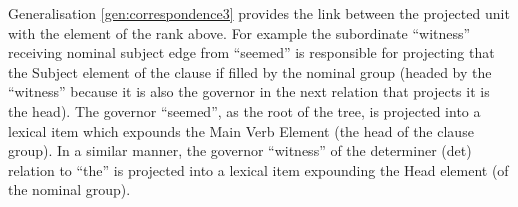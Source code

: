 Generalisation \ref{gen:correspondence3} provides the link between the projected unit with the element of the rank above. For example the subordinate ``witness'' receiving  nominal subject edge from ``seemed'' is responsible for projecting that the Subject element of the clause if filled by the nominal group (headed by the ``witness'' because it is also the governor in the next relation that projects it is the head). The governor ``seemed'', as the root of the tree, is projected into a lexical item which expounds the Main Verb Element (the head of the clause group). In a similar manner, the governor ``witness'' of the determiner (det) relation to ``the'' is projected into a lexical item expounding the Head element (of the nominal group). 


%

